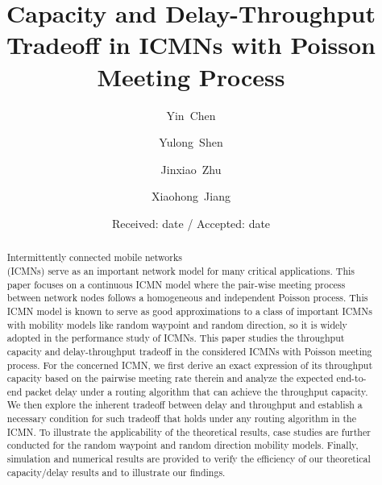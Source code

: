\documentclass[twocolumn, 10pt]{svjour3}         \smartqed  \usepackage{graphicx}
\begin{document}
\title{Capacity and Delay-Throughput Tradeoff in ICMNs with Poisson Meeting Process}



\author{Yin~Chen \and Yulong~Shen \and Jinxiao~Zhu \and Xiaohong~Jiang}








\date{Received: date / Accepted: date}



\maketitle

\begin{abstract}




Intermittently connected mobile networks \\(ICMNs) serve as an important network model for many critical applications. This paper focuses on a continuous ICMN model where the pair-wise meeting process between network nodes
follows a homogeneous and independent Poisson process. This ICMN model is known to serve as good approximations to a class of important ICMNs with mobility models like random waypoint and random direction, so it is widely adopted in
the performance study of ICMNs. This paper studies the throughput capacity and delay-throughput tradeoff  in the considered ICMNs with Poisson meeting process.
For the concerned ICMN, we first derive an exact expression of its throughput capacity based on the pairwise meeting rate therein and analyze the expected end-to-end packet delay under a routing algorithm that can achieve the throughput capacity. We then explore the inherent tradeoff between delay and throughput and establish a necessary condition for such tradeoff that holds under any routing algorithm in the ICMN. To illustrate the applicability of the theoretical results, case studies are further conducted for the random waypoint and random direction mobility models. 
Finally, simulation and numerical results are provided to verify the efficiency of our theoretical capacity/delay results and to illustrate
our findings.







\end{abstract}
\end{document}
